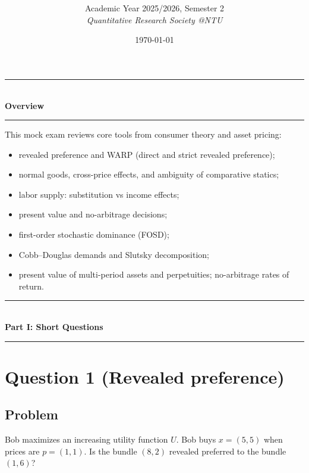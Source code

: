 \documentclass[12pt]{article}
\title{
\CourseCode \CourseName \\[0.3em]
\large \DocType
}
\author{
  Academic Year 2025/2026, Semester 2 \\[0.25em]
  \textit{Quantitative Research Society @NTU}
}
\date{\today}
\begin{document}
\maketitle
\thispagestyle{plainfirst}
\pagestyle{main}
\bigskip

\begin{center}
  \rule{0.8\textwidth}{0.4pt}\\[4pt]
  \textbf{Overview}\\[2pt]
  \rule{0.8\textwidth}{0.4pt}
\end{center}

\noindent
This mock exam reviews core tools from consumer theory and asset pricing:
\begin{itemize}[leftmargin=*]
  \item revealed preference and WARP (direct and strict revealed preference);
  \item normal goods, cross-price effects, and ambiguity of comparative statics;
  \item labor supply: substitution vs income effects;
  \item present value and no-arbitrage decisions;
  \item first-order stochastic dominance (FOSD);
  \item Cobb--Douglas demands and Slutsky decomposition;
  \item present value of multi-period assets and perpetuities; no-arbitrage rates of return.
\end{itemize}

\bigskip

\newpage
\begin{center}
  \rule{0.9\textwidth}{0.6pt}\\[6pt]
  {\Large \textbf{Part I: Short Questions}}\\[4pt]
  \rule{0.9\textwidth}{0.6pt}
\end{center}

\section*{Question 1 (Revealed preference)}
\subsection*{Problem}
Bob maximizes an increasing utility function \(U\).
Bob buys \(x=(5,5)\) when prices are \(p=(1,1)\).
Is the bundle \((8,2)\) revealed preferred to the bundle \((1,6)\)?
\end{document}

